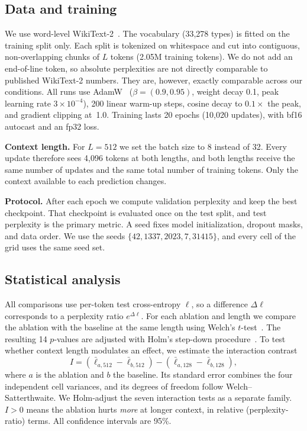 \documentclass[conference]{IEEEtran}
\begin{document}
\subsection{Data and training}
We use word-level WikiText-2~\cite{merity2017pointer}. The vocabulary (33{,}278 types) is fitted on
the training split only. Each split is tokenized on whitespace and cut into contiguous,
non-overlapping chunks of $L$ tokens (2.05M training tokens). We do not add an end-of-line token,
so absolute perplexities are not directly comparable to published WikiText-2 numbers. They are,
however, exactly comparable across our conditions. All runs use AdamW~\cite{loshchilov2019decoupled}
($\beta{=}(0.9,0.95)$, weight decay 0.1, peak learning rate $3{\times}10^{-4}$), 200 linear warm-up
steps, cosine decay to $0.1\times$ the peak, and gradient clipping at~1.0. Training lasts 20 epochs
(10{,}020 updates), with bf16 autocast and an fp32 loss.

\textbf{Context length.} For $L{=}512$ we set the batch size to 8 instead of 32. Every update
therefore sees 4{,}096 tokens at both lengths, and both lengths receive the same number of updates
and the same total number of training tokens. Only the context available to each prediction changes.

\textbf{Protocol.} After each epoch we compute validation perplexity and keep the best checkpoint.
That checkpoint is evaluated once on the test split, and test perplexity is the primary metric.
A seed fixes model initialization, dropout masks, and data order. We use the seeds
$\{42, 1337, 2023, 7, 31415\}$, and every cell of the grid uses the same seed set.

\subsection{Statistical analysis}
All comparisons use per-token test cross-entropy $\ell$, so a difference
$\Delta\ell$ corresponds to a perplexity ratio $e^{\Delta\ell}$. For each ablation and length we
compare the ablation with the baseline at the same length using Welch's
$t$-test~\cite{welch1947generalization}. The resulting 14 $p$-values are adjusted with Holm's
step-down procedure~\cite{holm1979simple}. To test whether context length modulates an effect, we
estimate the interaction contrast
\begin{equation}
I = (\bar\ell_{a,512}-\bar\ell_{b,512})-(\bar\ell_{a,128}-\bar\ell_{b,128}),
\end{equation}
where $a$ is the ablation and $b$ the baseline. Its standard error combines the four independent
cell variances, and its degrees of freedom follow Welch--Satterthwaite. We Holm-adjust the seven
interaction tests as a separate family. $I>0$ means the ablation hurts \emph{more} at longer
context, in relative (perplexity-ratio) terms. All confidence intervals are 95\%.
\end{document}
